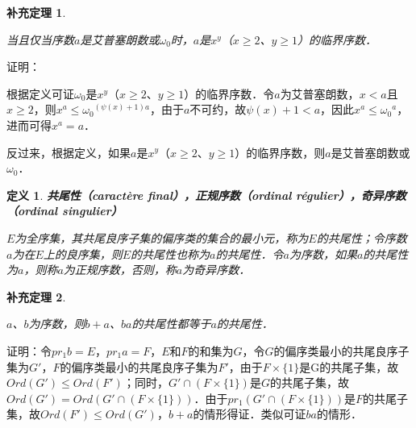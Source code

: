 \documentclass[12pt, a4paper, oneside]{book}
\newtheorem{cor}{补充定理}
\newtheorem{de}{定义}
\begin{document}
			\begin{cor}\label{cor369}
				\hfill\par
				当且仅当序数$a$是艾普塞朗数或$\omega_0$时，$a$是$x^y$（$x\geq 2$、$y\geq 1$）的临界序数．
			\end{cor}
			证明：
			\par
			根据定义可证$\omega_0$是$x^y$（$x\geq 2$、$y\geq 1$）的临界序数．令$a$为艾普塞朗数，$x<a$且$x\geq 2$，则$x^a\leq {\omega_0}^{(\psi(x)+1)a}$，由于$a$不可约，故$\psi(x)+1<a$，因此$x^a\leq {\omega_0}^a$，进而可得$x^a=a$．
			\par
			反过来，根据定义，如果$a$是$x^y$（$x\geq 2$、$y\geq 1$）的临界序数，则$a$是艾普塞朗数或$\omega_0$．
			
			\begin{de}
				\textbf{共尾性（caractère final），正规序数（ordinal régulier），奇异序数\\（ordinal singulier）}
				\par
				$E$为全序集，其共尾良序子集的偏序类的集合的最小元，称为$E$的共尾性；令序数$a$为在$E$上的良序集，则$E$的共尾性也称为$a$的共尾性．令$a$为序数，如果$a$的共尾性为$a$，则称$a$为正规序数，否则，称$a$为奇异序数．
			\end{de}
			
			\begin{cor}\label{cor370}
				\hfill\par
				$a$、$b$为序数，则$b+a$、$ba$的共尾性都等于$a$的共尾性．
			\end{cor}
			证明：令$pr_1b=E$，$pr_1a=F$，$E$和$F$的和集为$G$，令$G$的偏序类最小的共尾良序子集为$G'$，$F$的偏序类最小的共尾良序子集为$F'$，由于$F\times \{1\}$是G的共尾子集，故$Ord(G')\leq Ord(F')$；同时，$G'\cap(F\times \{1\})$是$G$的共尾子集，故$Ord(G')= Ord(G'\cap(F\times \{1\}))$．由于$pr_1(G'\cap(F\times \{1\}))$是$F$的共尾子集，故$Ord(F')\leq Ord(G')$，$b+a$的情形得证．类似可证$ba$的情形．
			
\end{document}
